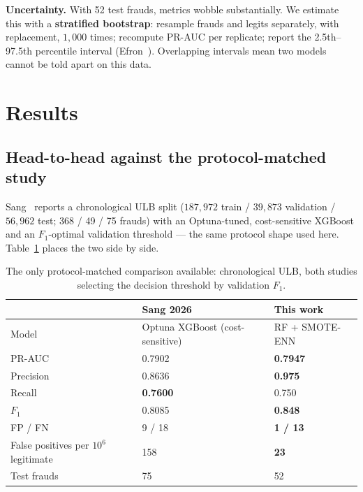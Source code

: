 \documentclass[11pt,a4paper]{article}
\newcommand{\term}[1]{\textbf{\textcolor{accent}{#1}}}
\begin{document}
\textbf{Uncertainty.} With 52 test frauds, metrics wobble substantially. We estimate this with
a \term{stratified bootstrap}: resample frauds and legits separately, with replacement,
$1{,}000$ times; recompute PR-AUC per replicate; report the 2.5th--97.5th percentile interval
(Efron~\cite{efron1979}). Overlapping intervals mean two models cannot be told apart on this
data.

\section{Results}

\subsection{Head-to-head against the protocol-matched study}\label{sec:headtohead}
Sang~\cite{eai2026} reports a chronological ULB split ($187{,}972$ train / $39{,}873$
validation / $56{,}962$ test; 368 / 49 / 75 frauds) with an Optuna-tuned, cost-sensitive
XGBoost and an $F_1$-optimal validation threshold --- the same protocol shape used here.
Table~\ref{tab:h2h} places the two side by side.

\begin{table}[h]
      \centering\small
      \caption{The only protocol-matched comparison available: chronological ULB, both studies
      selecting the decision threshold by validation $F_1$.}
      \label{tab:h2h}
      \begin{tabularx}{\textwidth}{Xll}
            \toprule
            & Sang 2026~\cite{eai2026} & This work\\
            \midrule
            Model & Optuna XGBoost (cost-sensitive) & RF + SMOTE-ENN\\
            PR-AUC & 0.7902 & \textbf{0.7947}\\
            Precision & 0.8636 & \textbf{0.975}\\
            Recall & \textbf{0.7600} & 0.750\\
            $F_1$ & 0.8085 & \textbf{0.848}\\
            FP / FN & 9 / 18 & \textbf{1 / 13}\\
            False positives per $10^6$ legitimate & 158 & \textbf{23}\\
            Test frauds & 75 & 52\\
            \bottomrule
      \end{tabularx}
\end{table}
\end{document}
